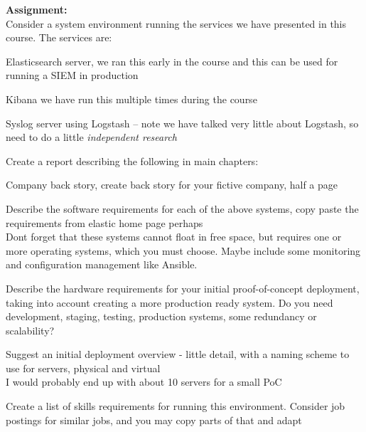 \documentclass[a4paper,11pt,notitlepage,landscape]{report}
\begin{document}
\rm
{}

\newcommand{\subject}[1]{SIEM and Log Analysis course}




\normal


{\bf Assignment:}\\
Consider a system environment running the services we have presented in this course. The services are:

\begin{list2}
\item Elasticsearch server, we ran this early in the course and this can be used for running a SIEM in production
\item Kibana we have run this multiple times during the course
\item Syslog server using Logstash -- note we have talked very little about Logstash, so need to do a little \emph{independent research}
\end{list2}

Create a report describing the following in main chapters:

\begin{list2}
\item Company back story, create back story for your fictive company, half a page
\item Describe the software requirements for each of the above systems, copy paste the requirements from elastic home page perhaps\\
Dont forget that these systems cannot float in free space, but requires one or more operating systems, which you must choose. Maybe include some monitoring and configuration management like Ansible.
\item Describe the hardware requirements for your initial proof-of-concept deployment, taking into account creating a more production ready system. Do you need development, staging, testing, production systems, some redundancy or scalability?
\item Suggest an initial deployment overview - little detail, with a naming scheme to use for servers, physical and virtual\\
I would probably end up with about 10 servers for a small PoC
\item Create a list of skills requirements for running this environment. Consider job postings for similar jobs, and you may copy parts of that and adapt
\end{list2}
\end{document}
